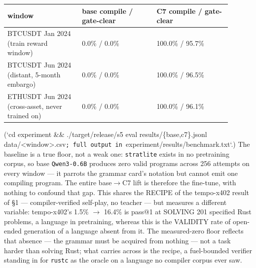\documentclass[11pt]{article}
\newcommand{\code}[1]{\texttt{#1}}
\begin{document}
\begingroup\small
\begin{longtable}{p{0.300\linewidth} p{0.300\linewidth} p{0.300\linewidth}}
\toprule
\textbf{window} & \textbf{base compile / gate-clear} & \textbf{C7 compile / gate-clear} \\
\midrule\endhead
BTCUSDT Jan 2024 (train reward window) & 0.0\% / 0.0\% & 100.0\% / 95.7\% \\
BTCUSDT Jun 2024 (distant, 5-month embargo) & 0.0\% / 0.0\% & 100.0\% / 96.5\% \\
ETHUSDT Jun 2024 (cross-asset, never trained on) & 0.0\% / 0.0\% & 100.0\% / 96.1\% \\
\bottomrule
\end{longtable}\endgroup

(`cd experiment \&\& ./target/release/s5 eval results/\{base,c7\}.jsonl
data/<window>.csv\code{; full output in }experiment/results/benchmark.txt`.) The
baseline is a true floor, not a weak one: \code{stratlite} exists in no pretraining
corpus, so base \code{Qwen3-0.6B} produces zero valid programs across 256 attempts on
every window --- it parrots the grammar card's notation but cannot emit one
compiling program. The entire base$\rightarrow$C7 lift is therefore the fine-tune, with
nothing to confound that gap. This shares the RECIPE of the tempo-x402 result of
\S{}1 --- compiler-verified self-play, no teacher --- but measures a different variable:
tempo-x402's 1.5\% $\rightarrow$ 16.4\% is pass@1 at SOLVING 201 specified Rust problems, a
language in pretraining, whereas this is the VALIDITY rate of open-ended
generation of a language absent from it. The measured-zero floor reflects that
absence --- the grammar must be acquired from nothing --- not a task harder than
solving Rust; what carries across is the recipe, a fuel-bounded verifier standing
in for \code{rustc} as the oracle on a language no compiler corpus ever saw.
\end{document}
